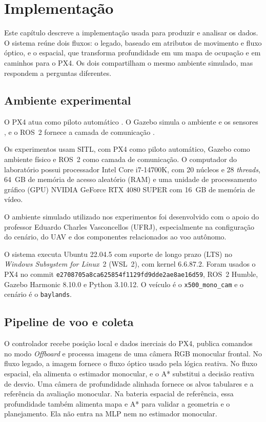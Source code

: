 \chapter{Implementação}\label{cap:implementacao}


Este capítulo descreve a implementação usada para produzir e analisar os dados. O sistema reúne dois fluxos: o legado, baseado em atributos de movimento e fluxo óptico, e o espacial, que transforma profundidade em um mapa de ocupação e em caminhos para o PX4. Os dois compartilham o mesmo ambiente simulado, mas respondem a perguntas diferentes.

\section{Ambiente experimental}

O PX4 atua como piloto automático \cite{Meier8092}. O Gazebo simula o ambiente e os sensores \cite{Koenig7803}, e o ROS~2 fornece a camada de comunicação \cite{Macenski2022}.


Os experimentos usam SITL, com PX4 como piloto automático, Gazebo como ambiente físico e ROS~2 como camada de comunicação. O computador do laboratório possui processador Intel Core i7-14700K, com 20 núcleos e 28 \textit{threads}, 64~GB de memória de acesso aleatório (RAM) e uma unidade de processamento gráfico (GPU) NVIDIA GeForce RTX 4080 SUPER com 16~GB de memória de vídeo.

O ambiente simulado utilizado nos experimentos foi desenvolvido com o apoio do professor Eduardo Charles Vasconcellos (UFRJ), especialmente na configuração do cenário, do UAV e dos componentes relacionados ao voo autônomo.

O sistema executa Ubuntu 22.04.5 com suporte de longo prazo (LTS) no \textit{Windows Subsystem for Linux}~2 (WSL~2), com kernel 6.6.87.2. Foram usados o PX4 no commit \texttt{e2708705a8ca625854f1129fd9dde2ae8ae16d59}, ROS~2 Humble, Gazebo Harmonic 8.10.0 e Python 3.10.12. O veículo é o \texttt{x500\_mono\_cam} e o cenário é o \texttt{baylands}.

\section{Pipeline de voo e coleta}

O controlador recebe posição local e dados inerciais do PX4, publica comandos no modo \textit{Offboard} e processa imagens de uma câmera RGB monocular frontal. No fluxo legado, a imagem fornece o fluxo óptico usado pela lógica reativa. No fluxo espacial, ela alimenta o estimador monocular, e o A* substitui a decisão reativa de desvio. Uma câmera de profundidade alinhada fornece os alvos tabulares e a referência da avaliação monocular. Na bateria espacial de referência, essa profundidade também alimenta mapa e A* para validar a geometria e o planejamento. Ela não entra na MLP nem no estimador monocular.


